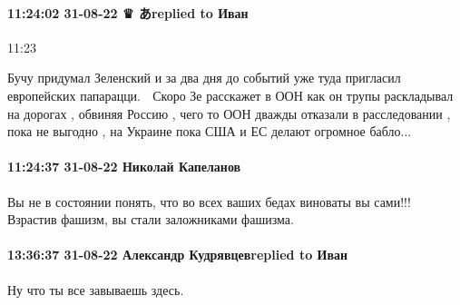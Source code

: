 \paragraph{11:24:02 31-08-22 ♛ あreplied to Иван}
11:23

Бучу придумал Зеленский и за два дня до событий уже туда пригласил европейских
папарацци. 🤣 Скоро Зе расскажет в ООН как он трупы раскладывал на дорогах ,
обвиняя Россию , чего то ООН дважды отказали в расследовании , пока не выгодно
, на Украине пока США и ЕС делают огромное бабло...

\paragraph{11:24:37 31-08-22 Николай Капеланов}

Вы не в состоянии понять, что во всех ваших бедах виноваты вы сами!!! Взрастив
фашизм, вы стали заложниками фашизма.

\paragraph{13:36:37 31-08-22 Александр Кудрявцевreplied to Иван}

Ну что ты все завываешь здесь.
